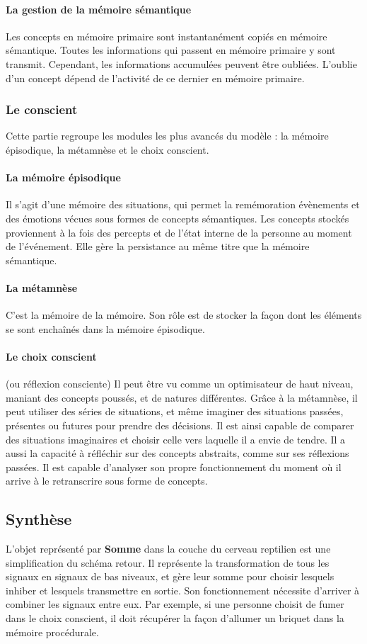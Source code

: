 \paragraph{La gestion de la mémoire sémantique} Les concepts en mémoire primaire sont instantanément copiés en mémoire sémantique. Toutes les informations qui passent en
mémoire primaire y sont transmit. Cependant, les informations accumulées peuvent être oubliées.
L'oublie d'un concept dépend de l'activité de ce dernier en mémoire primaire.

\subsubsection{Le conscient}
Cette partie regroupe les modules les plus avancés du modèle : la mémoire épisodique, la métamnèse et le choix conscient.

\paragraph{La mémoire épisodique} Il s'agit d'une mémoire des situations, qui permet la remémoration évènements et des émotions vécues sous formes de concepts sémantiques. Les concepts stockés proviennent à la fois des percepts et de l’état interne de la personne au moment de l'événement. Elle gère la persistance au même titre que la mémoire sémantique.

\paragraph{La métamnèse} C'est la mémoire de la mémoire. Son rôle est de stocker la
façon dont les éléments se sont enchaînés dans la mémoire épisodique.

\paragraph{Le choix conscient} (ou réflexion consciente) Il peut être vu comme un optimisateur de haut niveau, maniant des concepts poussés, et de natures différentes. Grâce à la métamnèse, il peut utiliser des séries de situations, et même imaginer des situations passées, présentes ou futures pour prendre des décisions. Il est ainsi capable de comparer des situations imaginaires et choisir celle vers laquelle il a envie de tendre. Il a aussi la capacité à réfléchir sur des concepts abstraits, comme sur ses réflexions passées. Il est capable d'analyser son propre fonctionnement du moment où il arrive à le retranscrire sous forme de concepts.

\subsection{Synthèse}
L’objet représenté par \textbf{Somme} dans la couche du cerveau reptilien est une simplification du schéma retour. Il représente la transformation de tous les signaux en signaux de bas niveaux, et gère leur somme pour choisir lesquels inhiber et lesquels transmettre en sortie. Son fonctionnement nécessite d'arriver à combiner les signaux entre eux. Par exemple, si une personne choisit de fumer dans le choix conscient, il doit récupérer la façon d'allumer un briquet dans la mémoire procédurale.
